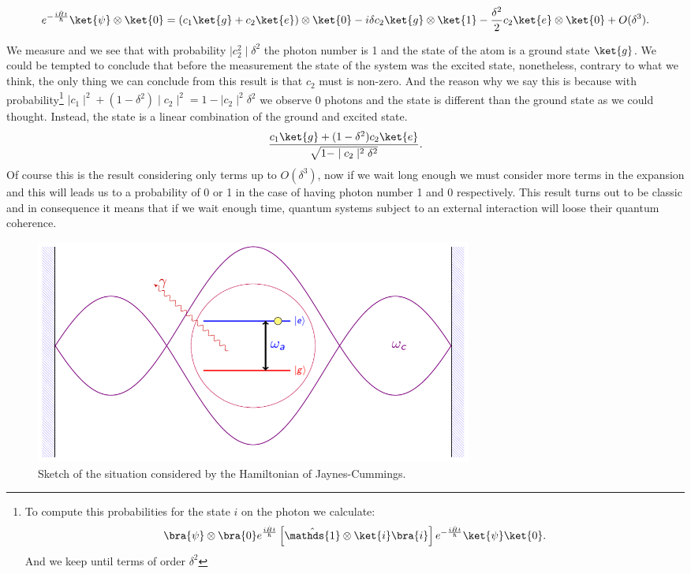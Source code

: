 \begin{appendix}
\[e^{-\frac{i\hat{H}t}{\hbar}}\ket{\psi}\otimes\ket{0}=(c_1\ket{g}+c_2\ket{e})\otimes\ket{0}-i\delta c_2\ket{g}\otimes\ket{1}-\frac{\delta^2}{2}c_2\ket{e}\otimes\ket{0}+O(\delta^3).\]

We measure and we see that with probability $\mid c^2_2\mid\delta^2$ the photon number is 1 and the state of the atom is a ground state $\ket{g}$. We could be tempted to conclude that before the measurement the state of the system was the excited state, nonetheless, contrary to what we think, the only thing we can conclude from this result is that $c_2$ must is non-zero. And the reason why we say this is because with probability\footnote{To compute this probabilities for the state $i$ on the photon we calculate:
\[\bra{\psi}\otimes\bra{0}e^{\frac{i\hat{H}t}{\hbar}}\left[\hat{\mathds{1}}\otimes\ket{i}\bra{i}\right]e^{-\frac{i\hat{H}t}{\hbar}}\ket{\psi}\ket{0}.\]
And we keep until terms of order $\delta^2$}
 $\mid c_1\mid^2+(1-\delta^2)\mid c_2 \mid^2=1-\mid c_2 \mid^2\delta^2$  we observe 0 photons and the state is different than the ground state as we could thought. Instead, the state is a linear combination of the ground and excited state.
\[\frac{c_1\ket{g}+(1-\delta^2)c_2\ket{e}}{\sqrt{1-\mid c_2\mid^2\delta^2}}.\]
Of course this is the result considering only terms up to $O(\delta^3)$, now if we wait long enough we must consider more terms in the expansion and this will leads us to a probability of 0 or 1 in the case of having photon number 1 and 0 respectively. This result turns out to be classic and in consequence it means that if we wait enough time, quantum systems subject to an external interaction will loose their quantum coherence.

\begin{figure}[h!]
\centering
\includegraphics[width=0.7\textwidth]{Figures/presentationI.pdf}
\caption{Sketch of the situation considered by the Hamiltonian of Jaynes-Cummings.}
\label{Jaynescummings}
\end{figure}


\end{appendix}
